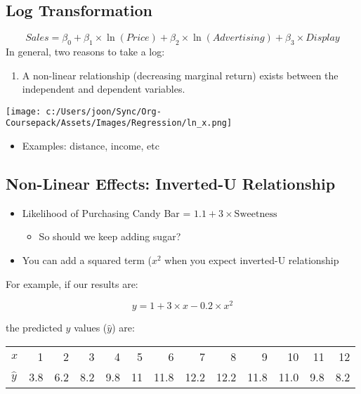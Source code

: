 \documentclass[10pt,article]{article}
\begin{document}
\subsection{Log Transformation}
\label{sec:org7ea89a8}
\[ Sales = \beta_0 + \beta_1 \times \ln(Price) + \beta_2 \times
           \ln(Advertising) + \beta_3 \times Display \]
In general, two reasons to take a log:

\begin{enumerate}
\item A non-linear relationship (decreasing marginal return) exists between the
independent and dependent variables.
\end{enumerate}

\begin{center}
\texttt{[image: c:/Users/joon/Sync/Org-Coursepack/Assets/Images/Regression/ln\_x.png]}
\end{center}

\begin{itemize}
\item Examples: distance, income, etc
\end{itemize}
\subsection{Non-Linear Effects: Inverted-U Relationship}
\label{sec:orgcabae6b}
\begin{itemize}
\item Likelihood of Purchasing Candy Bar = \(1.1 + 3 \times \text{Sweetness}\)

\begin{itemize}
\item So should we keep adding sugar?
\end{itemize}

\item You can add a squared term (\(x^{2}\) when you expect inverted-U relationship
\end{itemize}

For example, if our results are:

\[ y = 1 + 3 \times x - 0.2 \times x^2 \]

the predicted \(y\) values (\(\hat y\)) are:

\begin{center}
\begin{tabular}{lrrrrrrrrrrrr}
\(x\) & 1 & 2 & 3 & 4 & 5 & 6 & 7 & 8 & 9 & 10 & 11 & 12\\
\(\hat y\) & 3.8 & 6.2 & 8.2 & 9.8 & 11 & 11.8 & 12.2 & 12.2 & 11.8 & 11.0 & 9.8 & 8.2\\
\end{tabular}
\end{center}
\end{document}
